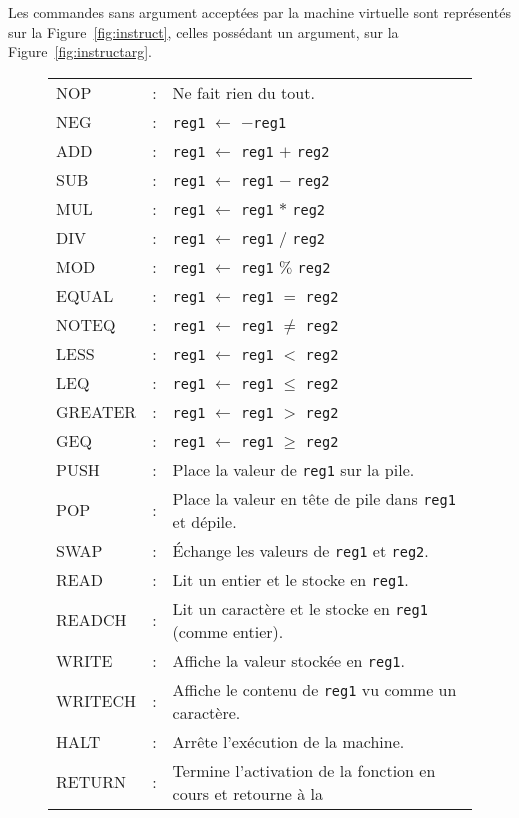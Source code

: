 \documentclass[12pt,a4]{article}
\begin{document}
Les commandes sans argument acceptées par la machine virtuelle sont
représentés sur la Figure~\ref{fig:instruct}, celles possédant un
argument, sur la Figure~\ref{fig:instructarg}.

\begin{figure}
  \centering
  \begin{tabular}{lll}
    NOP     &:& Ne fait rien du tout.\\
    NEG     &:& {\tt reg1} $\gets$ $-${\tt reg1}\\
    ADD     &:& {\tt reg1} $\gets$ {\tt reg1} $+$ {\tt reg2}\\
    SUB     &:& {\tt reg1} $\gets$ {\tt reg1} $-$ {\tt reg2}\\
    MUL     &:& {\tt reg1} $\gets$ {\tt reg1} $*$ {\tt reg2}\\
    DIV     &:& {\tt reg1} $\gets$ {\tt reg1} $/$ {\tt reg2}\\
    MOD     &:& {\tt reg1} $\gets$ {\tt reg1} $\%$ {\tt reg2}\\
    EQUAL   &:& {\tt reg1} $\gets$ {\tt reg1} $=$ {\tt reg2}\\
    NOTEQ   &:& {\tt reg1} $\gets$ {\tt reg1} $\neq$ {\tt reg2}\\
    LESS    &:& {\tt reg1} $\gets$ {\tt reg1} $<$ {\tt reg2}\\
    LEQ     &:& {\tt reg1} $\gets$ {\tt reg1} $\leqslant$ {\tt reg2}\\
    GREATER &:& {\tt reg1} $\gets$ {\tt reg1} $>$ {\tt reg2}\\
    GEQ     &:& {\tt reg1} $\gets$ {\tt reg1} $\geqslant$ {\tt reg2}\\
    PUSH    &:& Place la valeur de {\tt reg1} sur la pile.\\
    POP     &:& Place la valeur en tête de pile dans {\tt reg1} et dépile.\\
    SWAP    &:& Échange les valeurs de {\tt reg1} et {\tt reg2}.\\
    READ    &:& Lit un entier et le stocke en {\tt reg1}.\\
    READCH  &:& Lit un caractère et le stocke en {\tt reg1} (comme entier).\\
    WRITE   &:& Affiche la valeur stockée en {\tt reg1}.\\
    WRITECH &:& Affiche le contenu de {\tt reg1} vu comme un caractère.\\
    HALT    &:& Arrête l'exécution de la machine.\\
    RETURN  &:& Termine l'activation de la fonction en cours et retourne à la\\

\end{tabular}
\end{figure}
\end{document}
